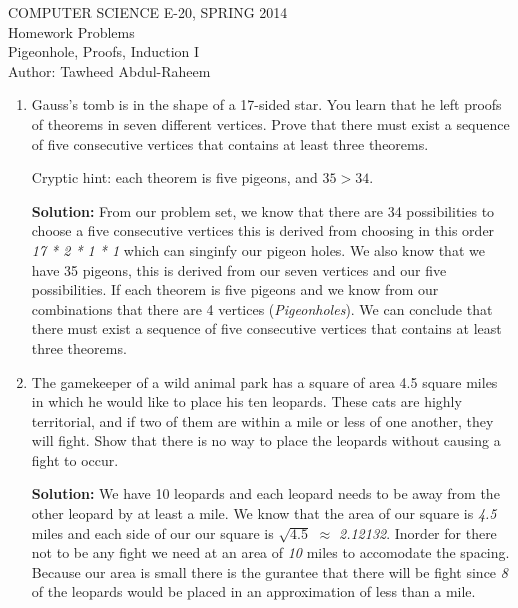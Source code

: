 \documentclass[12pt]{article}
\begin{document}
\begin{center}
    COMPUTER SCIENCE E-20, SPRING 2014 \\
    Homework Problems\\
    Pigeonhole, Proofs, Induction I \\
    Author: Tawheed Abdul-Raheem\\
\end{center}

\smallskip

\begin{enumerate}

    \item Gauss's tomb is in the shape of a 17-sided star. You learn that he left proofs of theorems in seven different vertices. Prove that there must exist a sequence of five consecutive vertices that contains at least three theorems.

        Cryptic hint: each theorem is five pigeons, and $35 > 34$.

        \textbf{Solution: } 
        From our problem set, we know that there are 34 possibilities to choose a five consecutive vertices this is derived
        from choosing in this order {\em 17 * 2 * 1 * 1} which can singinfy our pigeon holes. We also know that we have
        35 pigeons, this is derived from our seven vertices and our five possibilities. If each theorem is five pigeons and we know from our combinations that there are 4 vertices ({\em Pigeonholes}). We can conclude that there must exist a sequence of five consecutive vertices that contains at least three theorems.

    \item The gamekeeper of a wild animal park has a square of area 4.5 square miles in which he would like to place his ten leopards. These cats are highly territorial, and if two of them are within a mile or less of one another, they will fight. Show that there is no way to place the leopards without causing a fight to occur.

        \textbf{Solution: } 
        We have 10 leopards and each leopard needs to be away from the other leopard by at least a mile. We know that the area of our square is
        {\em 4.5} miles and each side of our our square is $\sqrt{4.5}$ $\approx$ {\em 2.12132}. 
        Inorder for there not to be any fight we need at an area
        of {\em 10} miles to accomodate the spacing. Because our area is small there is the gurantee that there will be fight since {\em 8} of the
        leopards would be placed in an approximation of less than a mile.


\end{enumerate}
\end{document}
